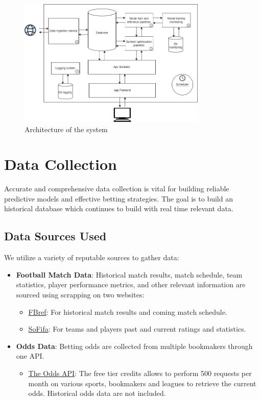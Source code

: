 \begin{figure}[H]
    \centering
    \includegraphics[width=0.8\textwidth, keepaspectratio]{images/Architecture_optimsportbet.png}
    \caption{Architecture of the system}
    \label{fig:elo_score_5_teams_during_time}
\end{figure}


\section{Data Collection}

Accurate and comprehensive data collection is vital for building reliable predictive models and effective betting strategies. The goal is to build an historical database which continues to build with real time relevant data.

\subsection{Data Sources Used}

We utilize a variety of reputable sources to gather data:

\begin{itemize}
    \item \textbf{Football Match Data}: Historical match results, match schedule, team statistics, player performance metrics, and other relevant information are sourced using scrapping on two websites: 
    \begin{itemize}
        \item \hyperlink{https://fbref.com/en/}{FBref}: For historical match results and coming match schedule.
        \item \hyperlink{https://sofifa.com/}{SoFifa}: For teams and players past and current ratings and statistics.
    \end{itemize}
    \item \textbf{Odds Data}: Betting odds are collected from multiple bookmakers through one API.
    \begin{itemize}
        \item \hyperlink{https://the-odds-api.com/}{The Odds API}: The free tier credits allows to perform 500 requests per month on various sports, bookmakers and leagues to retrieve the current odds. Historical odds data are not included.
    \end{itemize}
\end{itemize}


